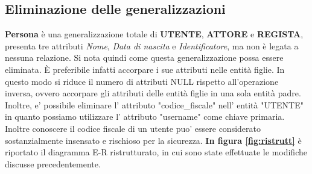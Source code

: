 \documentclass[12pt,a4paper]{article}
\begin{document}
\subsection{Eliminazione delle generalizzazioni}
\textbf {Persona} è una generalizzazione totale di \textbf{UTENTE}, \textbf{ATTORE} e \textbf{REGISTA}, presenta
tre attributi \textit{Nome}, \textit{Data di nascita} e \textit{Identificatore}, ma non è legata a nessuna relazione.
Si nota quindi come questa generalizzazione possa essere eliminata. È preferibile infatti
accorpare i sue attributi nelle entità figlie. In questo modo si riduce il numero di attributi NULL rispetto all'operazione inversa,
ovvero accorpare gli attributi delle entità figlie in una sola entità padre.\newline
Inoltre, e' possibile eliminare l' attributo "codice\_fiscale" nell' entità "UTENTE" in quanto possiamo utilizzare l' attributo "username" come chiave primaria. Inoltre conoscere il codice fiscale di un utente puo' essere considerato sostanzialmente insensato e rischioso per la sicurezza.\newline
\textbf{In figura \ref{fig:ristrutt}} è riportato il diagramma E-R ristrutturato, in cui sono state effettuate le modifiche discusse precedentemente.
\end{document}
